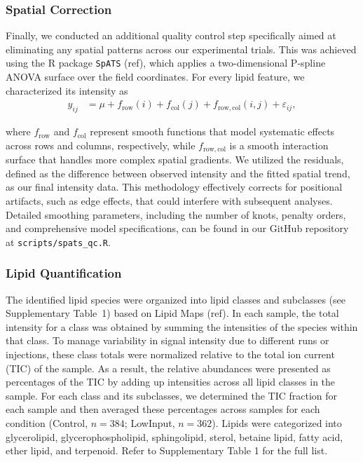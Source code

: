 \documentclass[10pt,letterpaper]{article}
\begin{document}
\subsubsection*{Spatial Correction}
Finally, we conducted an additional quality control step specifically aimed at eliminating any spatial patterns across our experimental trials. This was achieved using the R package \texttt{SpATS} (ref), which applies a two-dimensional P-spline ANOVA surface over the field coordinates. For every lipid feature, we characterized its intensity as
\begin{align}
  y_{ij} &= \mu + f_{\mathrm{row}}(i) + f_{\mathrm{col}}(j) + f_{\mathrm{row,col}}(i,j) + \varepsilon_{ij},
\end{align}

where \(f_{\mathrm{row}}\) and \(f_{\mathrm{col}}\) represent smooth functions that model systematic effects across rows and columns, respectively, while \(f_{\mathrm{row,col}}\) is a smooth interaction surface that handles more complex spatial gradients. We utilized the residuals, defined as the difference between observed intensity and the fitted spatial trend, as our final intensity data. This methodology effectively corrects for positional artifacts, such as edge effects, that could interfere with subsequent analyses. Detailed smoothing parameters, including the number of knots, penalty orders, and comprehensive model specifications, can be found in our GitHub repository at \texttt{scripts/spats\_qc.R}.


\subsubsection*{Lipid Quantification}
The identified lipid species were organized into lipid classes and subclasses (see Supplementary Table~1) based on Lipid Maps (ref). In each sample, the total intensity for a class was obtained by summing the intensities of the species within that class. To manage variability in signal intensity due to different runs or injections, these class totals were normalized relative to the total ion current (TIC) of the sample. As a result, the relative abundances were presented as percentages of the TIC by adding up intensities across all lipid classes in the sample. For each class and its subclasses, we determined the TIC fraction for each sample and then averaged these percentages across samples for each condition (Control, $n=384$; LowInput, $n=362$). Lipids were categorized into glycerolipid, glycerophospholipid, sphingolipid, sterol, betaine lipid, fatty acid, ether lipid, and terpenoid. Refer to Supplementary Table 1 for the full list. 
\end{document}
